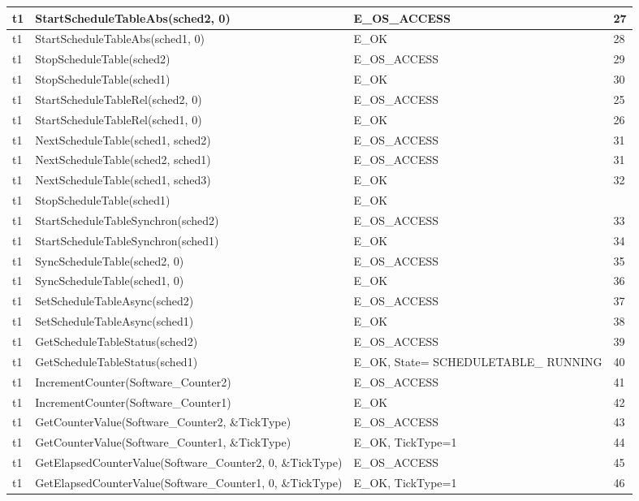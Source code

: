 \documentclass[10pt]{article}
\newlength{\Li}\settowidth{\Li}{Running}
\newlength{\Lii}\setlength{\Lii}{7cm}
\newlength{\Liiii}\setlength{\Liiii}{0.9cm}
\newlength{\Liii}\setlength{\Liii}{\textwidth} \addtolength{\Liii}{-\Li} \addtolength{\Liii}{-\Lii} \addtolength{\Liii}{-\Liiii}
\begin{document}
\begin{supertabular}{|p{\Li}|p{\Lii}|p{\Liii}|p{\Liiii}|}
	t1		& StartScheduleTableAbs(sched2, 0)				& E\_OS\_ACCESS					& 27 \\ \hline
	t1		& StartScheduleTableAbs(sched1, 0)				& E\_OK							& 28 \\ \hline
	t1		& StopScheduleTable(sched2)						& E\_OS\_ACCESS					& 29 \\ \hline
	t1		& StopScheduleTable(sched1)						& E\_OK							& 30 \\ \hline
	t1		& StartScheduleTableRel(sched2, 0)				& E\_OS\_ACCESS					& 25 \\ \hline
	t1		& StartScheduleTableRel(sched1, 0)				& E\_OK							& 26 \\ \hline
	t1		& NextScheduleTable(sched1, sched2)				& E\_OS\_ACCESS					& 31 \\ \hline
	t1		& NextScheduleTable(sched2, sched1)				& E\_OS\_ACCESS					& 31 \\ \hline
	t1		& NextScheduleTable(sched1, sched3)				& E\_OK							& 32 \\ \hline
	t1		& StopScheduleTable(sched1)						& E\_OK							& \\ \hline
	t1		& StartScheduleTableSynchron(sched2)				& E\_OS\_ACCESS					& 33 \\ \hline
	t1		& StartScheduleTableSynchron(sched1)				& E\_OK							& 34 \\ \hline
	t1		& SyncScheduleTable(sched2, 0)					& E\_OS\_ACCESS					& 35 \\ \hline
	t1		& SyncScheduleTable(sched1, 0)					& E\_OK							& 36 \\ \hline
	t1		& SetScheduleTableAsync(sched2)					& E\_OS\_ACCESS					& 37 \\ \hline
	t1		& SetScheduleTableAsync(sched1)					& E\_OK							& 38 \\ \hline
	t1		& GetScheduleTableStatus(sched2)					& E\_OS\_ACCESS					& 39 \\ \hline
	t1		& GetScheduleTableStatus(sched1)					& E\_OK, State= SCHEDULETABLE\_ RUNNING	& 40 \\ \hline
	
	t1		& IncrementCounter(Software\_Counter2)			& E\_OS\_ACCESS					& 41 \\ \hline
	t1		& IncrementCounter(Software\_Counter1)			& E\_OK							& 42 \\ \hline
	t1		& GetCounterValue(Software\_Counter2, \&TickType)	& E\_OS\_ACCESS					& 43 \\ \hline
	t1		& GetCounterValue(Software\_Counter1, \&TickType)	& E\_OK, TickType=1				& 44 \\ \hline
	t1		& GetElapsedCounterValue(Software\_Counter2, 0, \&TickType)		& E\_OS\_ACCESS			& 45 \\ \hline
	t1		& GetElapsedCounterValue(Software\_Counter1, 0, \&TickType)		& E\_OK, TickType=1		& 46 \\ \hline
	

\end{supertabular}
\end{document}
